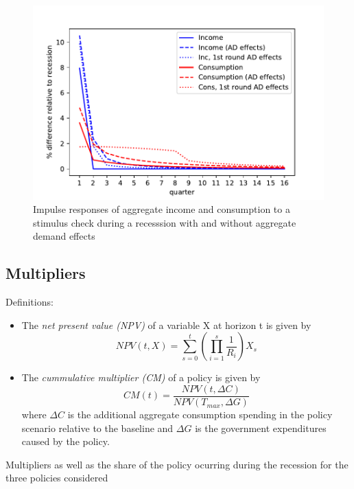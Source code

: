 \documentclass[11pt]{article}
\begin{document}
	\begin{figure}
		\centering
		\includegraphics[width=0.8\linewidth]{../Code/HA-Models/FromPandemicCode/Figures/recession_Check_relrecession}
		\caption{Impulse responses of aggregate income and consumption to a stimulus check during a recesssion with and without aggregate demand effects}
		\label{fig:recessioncheckrelrecession}
	\end{figure}

	\FloatBarrier
	\subsection{Multipliers}
	
	Definitions:
	\begin{itemize}
		\item The \textit{net present value (NPV)} of a variable X at horizon t is given by
		\begin{equation}
			NPV(t,X) = \sum_{s=0}^{t} \left( \prod_{i=1}^{s} \frac{1}{R_i} \right) X_s
		\end{equation}
		\item The \textit{cummulative multiplier (CM)} of a policy is given by
		\begin{equation}
			CM(t) = \frac{NPV(t,\Delta C)}{NPV (T_{max},\Delta G)}
		\end{equation}
		where $\Delta C$ is the additional aggregate consumption spending in the policy scenario relative to the baseline and $\Delta G$ is the government expenditures caused by the policy.
	\end{itemize}
	
	\begin{table} 
		\center
		
		\caption{Multipliers as well as the share of the policy ocurring during the recession for the three policies considered}
		\label{tab:Multiplier}
	\end{table}
\end{document}
